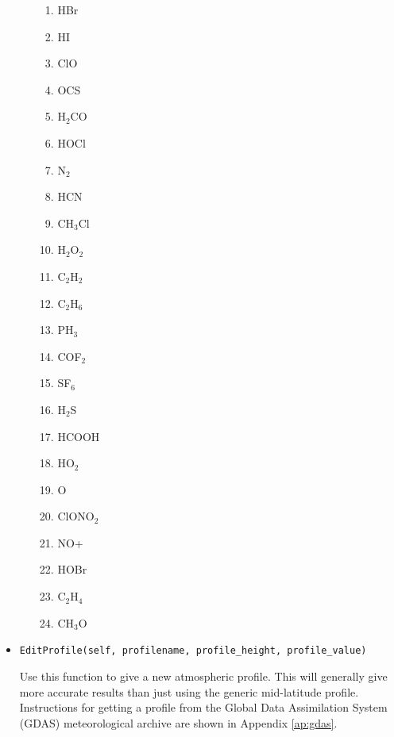 \documentclass{article}
\begin{document}
\begin{itemize}
\begin{itemize}
\begin{enumerate}
                \item   HBr
                \item   HI
                \item   ClO
                \item   OCS
                \item   H$_2$CO		 
                \item   HOCl
                \item   N$_2$
                \item   HCN
                \item   CH$_3$Cl
                \item   H$_2$O$_2$
                \item   C$_2$H$_2$
                \item   C$_2$H$_6$
                \item   PH$_3$
                \item   COF$_2$
                \item   SF$_6$
                \item   H$_2$S
                \item   HCOOH
                \item   HO$_2$
                \item   O
                \item   ClONO$_2$
                \item   NO+
                \item   HOBr
                \item   C$_2$H$_4$
                \item   CH$_3$O
  \end{enumerate}
  \end{itemize}
  
  \item \begin{Verbatim}[commandchars=\\\{\}]
EditProfile(self, profilename, profile_height, profile_value)
    \end{Verbatim}
   Use this function to give a new atmospheric profile. This will generally give more accurate results than just using the generic mid-latitude profile. Instructions for getting a profile from the Global Data Assimilation System (GDAS) meteorological archive are shown in Appendix \ref{ap:gdas}.
  

\end{itemize}
\end{document}
